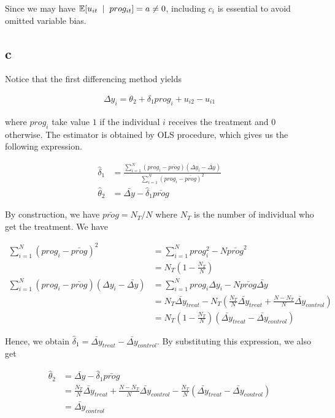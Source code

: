 \documentclass[11pt]{article}
\begin{document}
Since we may have $\mathbb{E}[u_{it} \;\mid \; prog_{it}] = a \neq 0$, including $c_i$ is essential to avoid omitted variable bias.

\subsection*{c}

Notice that the first differencing method yields

\begin{align*}
    \Delta y_i = \theta_2 + \delta_1 prog_{i} + u_{i2} - u_{i1}
\end{align*}

where $prog_{i}$ take value $1$ if the individual $i$ receives the treatment and $0$ otherwise. The estimator is obtained by OLS procedure, which gives us the following expression.

\begin{align*}
    \hat{\delta}_1 &= \frac{\sum_{i=1}^{N} (prog_i - \bar{prog}) (\Delta y_i - \bar{\Delta y})}{\sum_{i=1}^{N} (prog_i - \bar{prog})^2} \\
    \hat{\theta}_2 &= \bar{\Delta y} - \hat{\delta}_1 \bar{prog}
\end{align*}

By construction, we have $\bar{prog} = N_T/N$ where $N_T$ is the number of individual who get the treatment. We have

\begin{align*}
    \sum_{i=1}^{N} (prog_i - \bar{prog})^2
    &= \sum_{i=1}^{N} prog_i^2 - N \bar{prog}^2 \\
    &= N_T (1 - \frac{N_T}{N}) \\
    \sum_{i=1}^{N} (prog_i - \bar{prog}) (\Delta y_i - \bar{\Delta y})
    &= \sum_{i=1}^{N} prog_i \Delta y_i - N \bar{prog} \bar{\Delta y} \\
    &= N_T \bar{\Delta y}_{treat} - N_T \left( \frac{N_T}{N} \bar{\Delta y}_{treat} + \frac{N - N_T}{N} \bar{\Delta y}_{control} \right) \\
    &= N_T \left( 1 - \frac{N_T}{N} \right) (\bar{\Delta y}_{treat} - \bar{\Delta y}_{control})
\end{align*}

Hence, we obtain $\hat{\delta}_1 = \bar{\Delta y}_{treat} - \bar{\Delta y}_{control}$. By substituting this expression, we also get

\begin{align*}
    \hat{\theta}_2
    &= \bar{\Delta y} - \hat{\delta}_1 \bar{prog} \\
    &= \frac{N_T}{N} \bar{\Delta y}_{treat} + \frac{N - N_T}{N} \bar{\Delta y}_{control} - \frac{N_T}{N} (\bar{\Delta y}_{treat} - \bar{\Delta y}_{control}) \\
    &= \bar{\Delta y}_{control}
\end{align*}
\end{document}

